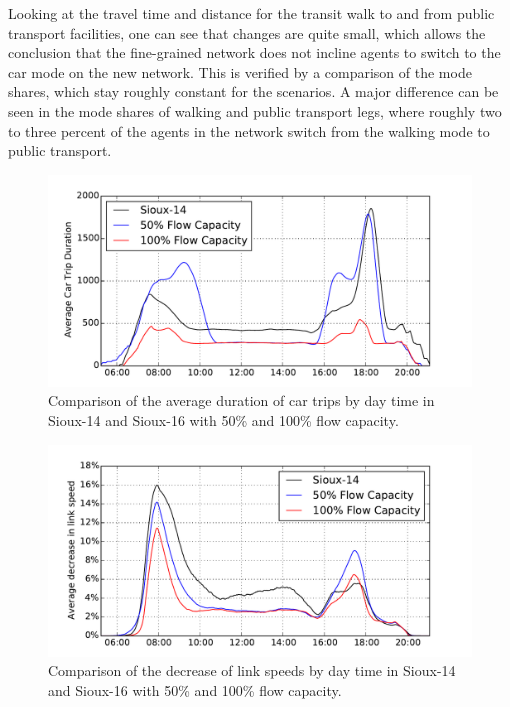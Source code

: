 Looking at the travel time and distance for the transit walk to and from public
transport facilities, one can see that changes are quite small, which allows the
conclusion that the fine-grained network does not incline agents to switch to the
car mode on the new network. This is verified by a comparison of the mode shares,
which stay roughly constant for the scenarios. A major difference can be seen in
the mode shares of walking and public transport legs, where roughly two to three
percent of the agents in the network switch from the walking mode to public
transport.

\begin{figure}
    \centering
    \includegraphics[width=1.0\textwidth]{figures/sioux_times.pdf}
    \caption{Comparison of the average duration of car trips by day time in Sioux-14 and Sioux-16 with 50\% and 100\% flow capacity.}
    \label{fig:sioux_times}
\end{figure}

\begin{figure}
    \centering
    \includegraphics[width=1.0\textwidth]{figures/sioux_speeds.pdf}
    \caption{Comparison of the decrease of link speeds by day time in Sioux-14 and Sioux-16 with 50\% and 100\% flow capacity. }
    \label{fig:sioux_speeds}
\end{figure}


